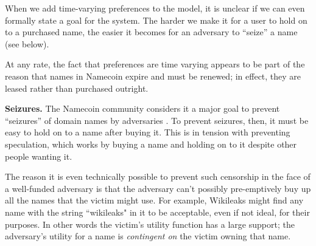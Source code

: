 When we add time-varying preferences to the model, it is unclear if we can even formally state a goal for the system. The harder we make it for a user to hold on to a purchased name, the easier it becomes for an adversary to ``seize'' a name (see below).

At any rate, the fact that preferences are time varying appears to be part of the reason that names in Namecoin expire and must be renewed; in effect, they are leased rather than purchased outright.

{\bf Seizures.} The Namecoin community considers it a major goal to prevent ``seizures'' of domain names by adversaries \cite{censorship}. To prevent seizures, then, it must be easy to hold on to a name after buying it. This is in tension with preventing speculation, which works by buying a name and holding on to it despite other people wanting it.

The reason it is even technically possible to prevent such censorship in the face of a well-funded adversary is that the adversary can't possibly pre-emptively buy up all the names that the victim might use. For example, Wikileaks might find any name with the string ``wikileaks" in it to be acceptable, even if not ideal, for their purposes. In other words the victim's utility function has a large support; the adversary's utility for a name is {\em contingent on} the victim owning that name.







